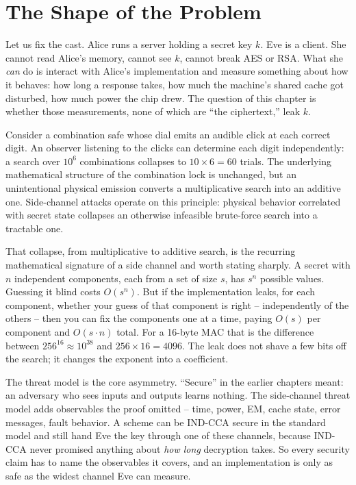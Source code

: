 \chapterline

\section{The Shape of the Problem}
\label{ch37:shape}

Let us fix the cast. Alice runs a server holding a secret key $k$. Eve is a client. She cannot read Alice's memory, cannot see $k$, cannot break AES or RSA. What she \emph{can} do is interact with Alice's implementation and measure something about how it behaves: how long a response takes, how much the machine's shared cache got disturbed, how much power the chip drew. The question of this chapter is whether those measurements, none of which are ``the ciphertext,'' leak $k$.

\begin{intuitionbox}
Consider a combination safe whose dial emits an audible click at each correct digit. An observer listening to the clicks can determine each digit independently: a search over $10^6$ combinations collapses to $10 \times 6 = 60$ trials. The underlying mathematical structure of the combination lock is unchanged, but an unintentional physical emission converts a multiplicative search into an additive one. Side-channel attacks operate on this principle: physical behavior correlated with secret state collapses an otherwise infeasible brute-force search into a tractable one.
\end{intuitionbox}

That collapse, from multiplicative to additive search, is the recurring mathematical signature of a side channel and worth stating sharply. A secret with $n$ independent components, each from a set of size $s$, has $s^{n}$ possible values. Guessing it blind costs $O(s^{n})$. But if the implementation leaks, for each component, whether your guess of that component is right -- independently of the others -- then you can fix the components one at a time, paying $O(s)$ per component and $O(s \cdot n)$ total. For a 16-byte MAC that is the difference between $256^{16} \approx 10^{38}$ and $256 \times 16 = 4096$. The leak does not shave a few bits off the search; it changes the exponent into a coefficient.

\begin{focusbox}
The threat model is the core asymmetry. ``Secure'' in the earlier chapters meant: an adversary who sees inputs and outputs learns nothing. The side-channel threat model adds observables the proof omitted -- time, power, EM, cache state, error messages, fault behavior. A scheme can be IND-CCA secure in the standard model and still hand Eve the key through one of these channels, because IND-CCA never promised anything about \emph{how long} decryption takes. So every security claim has to name the observables it covers, and an implementation is only as safe as the widest channel Eve can measure.
\end{focusbox}

